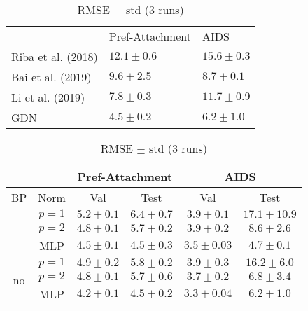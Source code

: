 \begin{table}[htbp]
    \addtolength{\tabcolsep}{-1pt}
    \fontsize{9pt}{10.25pt}\selectfont
    \centering
    \renewcommand{\arraystretch}{1.2}
    \begin{tabular}{|l|C{3cm}|C{3cm}|}
        \hline
        & Pref-Attachment & AIDS \\ \hhline{|=|=|=|}
        Riba et al. (2018) & $12.1 \pm 0.6$  & $15.6 \pm 0.3$ \\ \hline
        Bai et al. (2019) & $9.6 \pm 2.5$ & $8.7 \pm 0.1$ \\ \hline
        Li et al. (2019)& $7.8 \pm 0.3$ & $11.7 \pm 0.9$ \\ \hline
        GDN & $\boldsymbol{4.5 \pm 0.2}$ & $\boldsymbol{6.2 \pm 1.0}$ \\ \hline
    \end{tabular}
    \caption{RMSE $\pm$ std (3 runs)}
    \label{tab:ex1-baselines}
\end{table}

\begin{table}[htbp]
    \addtolength{\tabcolsep}{-1pt}
    \fontsize{9pt}{10.25pt}\selectfont
    \centering
    \renewcommand{\arraystretch}{1.2}
    \begin{tabular}{|c|c|c|c|c|c|}
        \hline
        \multicolumn{2}{|c|}{} & \multicolumn{2}{c|}{Pref-Attachment} & \multicolumn{2}{c|}{AIDS} \\ \hline
        BP & Norm & Val & Test & Val & Test \\ \hhline{|=|=|=|=|=|=|}
        \multirow{3}{*}{yes} & $p=1$ & $5.2 \pm 0.1$ & $6.4 \pm 0.7$ & $3.9 \pm 0.1$ & $17.1 \pm 10.9$ \\ \hhline{|~|-|-|-|-|-|}
        & $p=2$ & $4.8 \pm 0.1$ & $5.7 \pm 0.2$ & $3.9 \pm 0.2$ & $8.6 \pm 2.6$ \\ \hhline{|~|-|-|-|-|-|}
        & MLP & $4.5 \pm 0.1$ & $\boldsymbol{4.5 \pm 0.3}$ & $3.5 \pm 0.03$ & $\boldsymbol{4.7 \pm 0.1}$ \\ \hline
        \multirow{3}{*}{no}  & $p=1$ & $4.9 \pm 0.2$ & $5.8 \pm 0.2$ & $3.9 \pm 0.3$ & $16.2 \pm 6.0$ \\ \hhline{|~|-|-|-|-|-|}
        & $p=2$ & $4.8 \pm 0.1$ & $5.7 \pm 0.6$ & $3.7 \pm 0.2$ & $6.8 \pm 3.4$ \\ \hhline{|~|-|-|-|-|-|}
        & MLP & $4.2 \pm 0.1$ & $\boldsymbol{4.5 \pm 0.2}$ & $3.3 \pm 0.04$ & $6.2 \pm 1.0$ \\ \hline
    \end{tabular}
    \caption{RMSE $\pm$ std (3 runs)}
    \label{tab:ex1-ablation}
\end{table}



